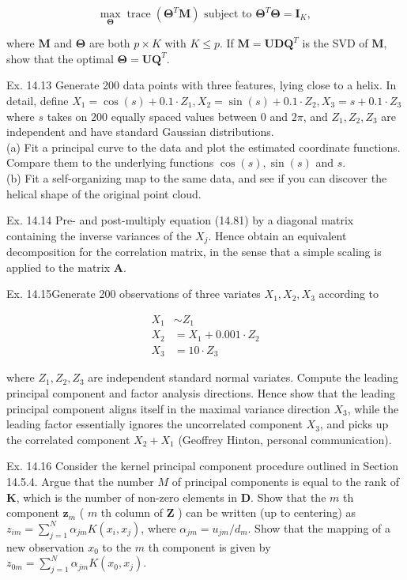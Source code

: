 \documentclass[10pt]{article}
\begin{document}
\begin{equation*}
\max _{\boldsymbol{\Theta}} \operatorname{trace}\left(\boldsymbol{\Theta}^{T} \mathbf{M}\right) \text { subject to } \boldsymbol{\Theta}^{T} \boldsymbol{\Theta}=\mathbf{I}_{K} \text {, } \tag{14.116}
\end{equation*}


where $\mathbf{M}$ and $\boldsymbol{\Theta}$ are both $p \times K$ with $K \leq p$. If $\mathbf{M}=\mathbf{U D Q}^{T}$ is the SVD of $\mathbf{M}$, show that the optimal $\boldsymbol{\Theta}=\mathbf{U Q}^{T}$.

Ex. 14.13 Generate 200 data points with three features, lying close to a helix. In detail, define $X_{1}=\cos (s)+0.1 \cdot Z_{1}, X_{2}=\sin (s)+0.1 \cdot Z_{2}, X_{3}= s+0.1 \cdot Z_{3}$ where $s$ takes on 200 equally spaced values between 0 and $2 \pi$, and $Z_{1}, Z_{2}, Z_{3}$ are independent and have standard Gaussian distributions.\\
(a) Fit a principal curve to the data and plot the estimated coordinate functions. Compare them to the underlying functions $\cos (s), \sin (s)$ and $s$.\\
(b) Fit a self-organizing map to the same data, and see if you can discover the helical shape of the original point cloud.

Ex. 14.14 Pre- and post-multiply equation (14.81) by a diagonal matrix containing the inverse variances of the $X_{j}$. Hence obtain an equivalent decomposition for the correlation matrix, in the sense that a simple scaling is applied to the matrix $\mathbf{A}$.

Ex. 14.15Generate 200 observations of three variates $X_{1}, X_{2}, X_{3}$ according to


\begin{align*}
X_{1} & \sim Z_{1} \\
X_{2} & =X_{1}+0.001 \cdot Z_{2} \\
X_{3} & =10 \cdot Z_{3} \tag{14.117}
\end{align*}


where $Z_{1}, Z_{2}, Z_{3}$ are independent standard normal variates. Compute the leading principal component and factor analysis directions. Hence show that the leading principal component aligns itself in the maximal variance direction $X_{3}$, while the leading factor essentially ignores the uncorrelated component $X_{3}$, and picks up the correlated component $X_{2}+X_{1}$ (Geoffrey Hinton, personal communication).

Ex. 14.16 Consider the kernel principal component procedure outlined in Section 14.5.4. Argue that the number $M$ of principal components is equal to the rank of $\mathbf{K}$, which is the number of non-zero elements in $\mathbf{D}$. Show that the $m$ th component $\mathbf{z}_{m}$ ( $m$ th column of $\mathbf{Z}$ ) can be written (up to centering) as $z_{i m}=\sum_{j=1}^{N} \alpha_{j m} K\left(x_{i}, x_{j}\right)$, where $\alpha_{j m}=u_{j m} / d_{m}$. Show that the mapping of a new observation $x_{0}$ to the $m$ th component is given by $z_{0 m}=\sum_{j=1}^{N} \alpha_{j m} K\left(x_{0}, x_{j}\right)$.
\end{document}
